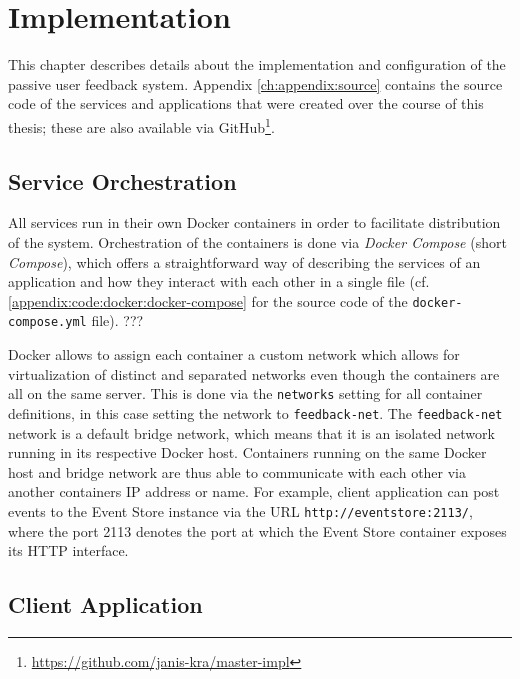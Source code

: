 %
\chapter{Implementation}
\label{ch:implementation}

This chapter describes details about the implementation and configuration of the passive user feedback system.
Appendix \cref{ch:appendix:source} contains the source code of the services and applications that were created over the course of this thesis; these are also available via GitHub\footnote{\url{https://github.com/janis-kra/master-impl}}.

\section{Service Orchestration}
\label{sec:implementation:orchestration}

All services run in their own Docker containers in order to facilitate distribution of the system.
Orchestration of the containers is done via \emph{Docker Compose} (short \emph{Compose}), which offers a straightforward way of describing the services of an application and how they interact with each other in a single file (cf. \cref{appendix:code:docker:docker-compose} for the source code of the \texttt{docker-compose.yml} file).
???

Docker allows to assign each container a custom network which allows for virtualization of distinct and separated networks even though the containers are all on the same server.
This is done via the \texttt{networks} setting for all container definitions, in this case setting the network to \texttt{feedback-net}.
The \texttt{feedback-net} network is a default bridge network, which means that it is an isolated network running in its respective Docker host.
Containers running on the same Docker host and bridge network are thus able to communicate with each other via another containers IP address or name.
For example, client application can post events to the Event Store instance via the URL \texttt{http://eventstore:2113/}, where the port 2113 denotes the port at which the Event Store container exposes its \ac{HTTP} interface.

\section{Client Application}
\label{sec:implementation:client}

